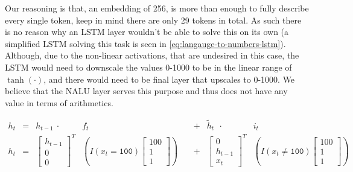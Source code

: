 Our reasoning is that, an embedding of 256, is more than enough to fully describe every single token, keep in mind there are only 29 tokens in total. As such there is no reason why an LSTM layer wouldn't be able to solve this on its own (a simplified LSTM solving this task is seen in \eqref{eq:langauge-to-numbers-lstm}). Although, due to the non-linear activations, that are undesired in this case, the LSTM would need to downscale the values 0-1000 to be in the linear range of $\tanh(\cdot)$, and there would need to be final layer that upscales to 0-1000. We believe that the NALU layer serves this purpose and thus does not have any value in terms of arithmetics.

\begin{equation}
\begin{aligned}
h_t &= &h_{t-1}\ \cdot\ &f_t &&+ &\tilde{h}_{t}\ \ \cdot\ &i_t \\
h_t &= &\begin{bmatrix}
 h_{t-1} \\
 0 \\
 0
\end{bmatrix}^T &\left(I(x_t = \texttt{100})\begin{bmatrix}100 \\ 1 \\ 1\end{bmatrix}\right)\ &&+ &\begin{bmatrix}
 0 \\
 h_{t-1} \\
 x_t
\end{bmatrix}^T &\left(I(x_t \not= \texttt{100})\begin{bmatrix}100 \\ 1 \\ 1\end{bmatrix}\right)
\end{aligned}
\label{eq:langauge-to-numbers-lstm}
\end{equation}